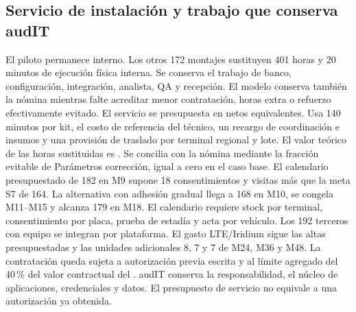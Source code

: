 \subsection{Servicio de instalación y trabajo que conserva audIT}\label{sec:eco-instalacion}
El piloto permanece interno. Los otros 172 montajes sustituyen 401 horas y 20 minutos de ejecución física interna. Se conserva el trabajo de banco, configuración, integración, analista, QA y recepción. El modelo conserva también la nómina mientras falte acreditar menor contratación, horas extra o refuerzo efectivamente evitado.
El servicio se presupuesta en  netos equivalentes. Usa 140 minutos por kit, el costo de referencia del técnico, un recargo de coordinación e insumos y una provisión de traslado por terminal regional y lote. El valor teórico de las horas sustituidas es . Se concilia con la nómina mediante la fracción evitable de Parámetros corrección, igual a cero en el caso base. El calendario presupuestado de 182 en M9 supone 18 consentimientos y visitas más que la meta S7 de 164. La alternativa con adhesión gradual llega a 168 en M10, se congela M11--M15 y alcanza 179 en M18. El calendario requiere stock por terminal, consentimiento por placa, prueba de estadía y acta por vehículo. Los 192 terceros con equipo se integran por plataforma. El gasto LTE/Iridium sigue las altas presupuestadas y las unidades adicionales 8, 7 y 7 de M24, M36 y M48.
La contratación queda sujeta a autorización previa escrita y al límite agregado del 40\,\% del valor contractual del . audIT conserva la responsabilidad, el núcleo de aplicaciones, credenciales y datos. El presupuesto de servicio no equivale a una autorización ya obtenida.

